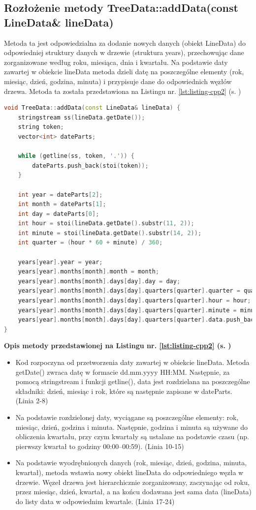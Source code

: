 \subsection{Rozłożenie metody TreeData::addData(const LineData\& lineData)}
Metoda ta jest odpowiedzialna za dodanie nowych danych (obiekt LineData) do odpowiedniej struktury danych w drzewie (struktura years), przechowując dane zorganizowane według roku, miesiąca, dnia i kwartału. Na podstawie daty zawartej w obiekcie lineData metoda dzieli datę na poszczególne elementy (rok, miesiąc, dzień, godzina, minuta) i przypisuje dane do odpowiednich węzłów drzewa. Metoda ta została przedstawiona na Listingu nr. \ref{lst:listing-cpp2} (s. \pageref{lst:listing-cpp2}) \\
\begin{lstlisting}[caption=Metoda double oblicz\_pi, label={lst:listing-cpp2}, language=C++]
void TreeData::addData(const LineData& lineData) {
    stringstream ss(lineData.getDate());
    string token;
    vector<int> dateParts;

    while (getline(ss, token, '.')) {
        dateParts.push_back(stoi(token));
    }

    int year = dateParts[2];
    int month = dateParts[1];
    int day = dateParts[0];
    int hour = stoi(lineData.getDate().substr(11, 2));
    int minute = stoi(lineData.getDate().substr(14, 2));
    int quarter = (hour * 60 + minute) / 360;

    years[year].year = year;
    years[year].months[month].month = month;
    years[year].months[month].days[day].day = day;
    years[year].months[month].days[day].quarters[quarter].quarter = quarter;
    years[year].months[month].days[day].quarters[quarter].hour = hour;
    years[year].months[month].days[day].quarters[quarter].minute = minute;
    years[year].months[month].days[day].quarters[quarter].data.push_back(lineData);
}
\end{lstlisting}
\newpage 
\noindent\textbf{Opis metody przedstawionej na Listingu nr. \ref{lst:listing-cpp2} (s. \pageref{lst:listing-cpp2})}
\begin{itemize}
    \item Kod rozpoczyna od przetworzenia daty zawartej w obiekcie lineData. Metoda getDate() zwraca datę w formacie dd.mm.yyyy HH:MM. Następnie, za pomocą stringstream i funkcji getline(), data jest rozdzielana na poszczególne składniki: dzień, miesiąc i rok, które są następnie zapisane w dateParts. (Linia 2-8)
    \item Na podstawie rozdzielonej daty, wyciągane są poszczególne elementy: rok, miesiąc, dzień, godzina i minuta. Następnie, godzina i minuta są używane do obliczenia kwartału, przy czym kwartały są ustalane na podstawie czasu (np. pierwszy kwartał to godziny 00:00–00:59). (Linia 10-15)
    \item Na podstawie wyodrębnionych danych (rok, miesiąc, dzień, godzina, minuta, kwartał), metoda wstawia nowy obiekt lineData do odpowiedniego węzła w drzewie. Węzeł drzewa jest hierarchicznie zorganizowany, zaczynając od roku, przez miesiąc, dzień, kwartał, a na końcu dodawana jest sama data (lineData) do listy data w odpowiednim kwartale. (Linia 17-24)
\end{itemize}
